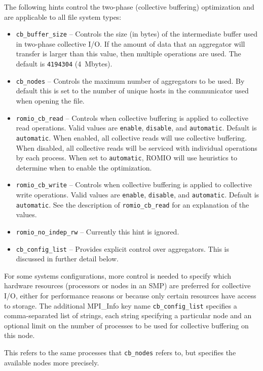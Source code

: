 The following hints control the two-phase (collective buffering)
optimization and are applicable to all file system types:
\begin{itemize}
\item \texttt{cb\_buffer\_size} -- Controls the size (in bytes) of the
intermediate buffer used in two-phase collective I/O.  If the amount
of data that an aggregator will transfer is larger than this value,
then multiple operations are used.  The default is \texttt{4194304} (4~Mbytes).
\item \texttt{cb\_nodes} -- Controls the maximum number of aggregators
to be used.  By default this is set to the number of unique hosts in the
communicator used when opening the file.
\item \texttt{romio\_cb\_read} -- Controls when collective buffering is
applied to collective read operations.  Valid values are
\texttt{enable}, \texttt{disable}, and \texttt{automatic}.  Default is
\texttt{automatic}.  When enabled, all collective reads will use
collective buffering.  When disabled, all collective reads will be
serviced with individual operations by each process.  When set to
\texttt{automatic}, ROMIO will use heuristics to determine when to
enable the optimization.
\item \texttt{romio\_cb\_write} -- Controls when collective buffering is
applied to collective write operations.  Valid values are 
\texttt{enable}, \texttt{disable}, and \texttt{automatic}.  Default is 
\texttt{automatic}.  See the description of \texttt{romio\_cb\_read} for
an explanation of the values.
\item \texttt{romio\_no\_indep\_rw} -- Currently this hint is ignored.
\item \texttt{cb\_config\_list} -- Provides explicit control over 
aggregators.  This is discussed in further detail below.
\end{itemize}

For some systems configurations, more control is needed to specify which
hardware resources (processors or nodes in an SMP) are preferred for
collective I/O, either for performance reasons or because only certain
resources have access to storage.  The additional MPI\_Info key name
\texttt{cb\_config\_list} specifies a comma-separated list of strings,
each string specifying a particular node and an optional limit on the
number of processes to be used for collective buffering on this node.

This refers to the same processes that \texttt{cb\_nodes} refers to,
but specifies the available nodes more precisely.

